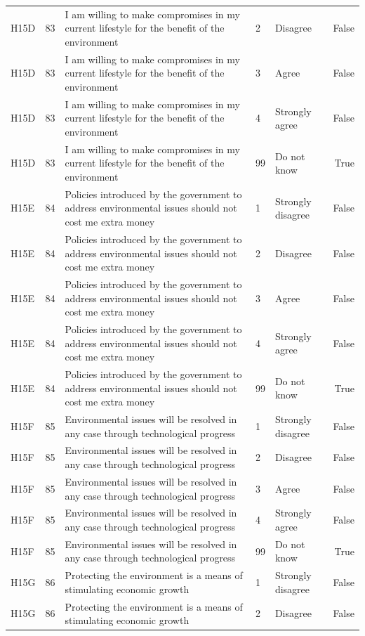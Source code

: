 \begin{tabular}{lrlllr}
H15D & 83 & I am willing to make compromises in my current lifestyle for the benefit of the environment & 2 & Disagree & False \\
H15D & 83 & I am willing to make compromises in my current lifestyle for the benefit of the environment & 3 & Agree & False \\
H15D & 83 & I am willing to make compromises in my current lifestyle for the benefit of the environment & 4 & Strongly agree & False \\
H15D & 83 & I am willing to make compromises in my current lifestyle for the benefit of the environment & 99 & Do not know & True \\
H15E & 84 & Policies introduced by the government to address environmental issues should not cost me extra money & 1 & Strongly disagree & False \\
H15E & 84 & Policies introduced by the government to address environmental issues should not cost me extra money & 2 & Disagree & False \\
H15E & 84 & Policies introduced by the government to address environmental issues should not cost me extra money & 3 & Agree & False \\
H15E & 84 & Policies introduced by the government to address environmental issues should not cost me extra money & 4 & Strongly agree & False \\
H15E & 84 & Policies introduced by the government to address environmental issues should not cost me extra money & 99 & Do not know & True \\
H15F & 85 & Environmental issues will be resolved in any case through technological progress & 1 & Strongly disagree & False \\
H15F & 85 & Environmental issues will be resolved in any case through technological progress & 2 & Disagree & False \\
H15F & 85 & Environmental issues will be resolved in any case through technological progress & 3 & Agree & False \\
H15F & 85 & Environmental issues will be resolved in any case through technological progress & 4 & Strongly agree & False \\
H15F & 85 & Environmental issues will be resolved in any case through technological progress & 99 & Do not know & True \\
H15G & 86 & Protecting the environment is a means of stimulating economic growth & 1 & Strongly disagree & False \\
H15G & 86 & Protecting the environment is a means of stimulating economic growth & 2 & Disagree & False \\

\end{tabular}
